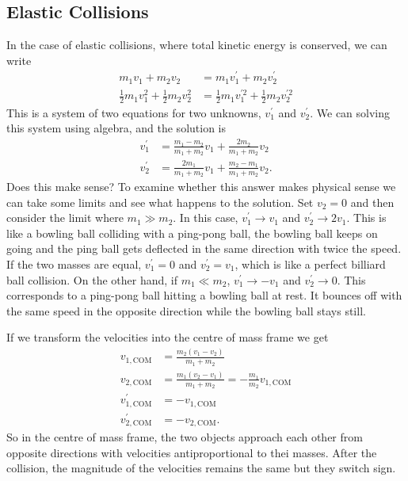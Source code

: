\documentclass[../classical_mechanics.tex]{subfiles}
\begin{document}
        \subsection{Elastic Collisions}\label{subsec:elastic-collisions}
            In the case of elastic collisions, where total kinetic energy is conserved, we can write
            \begin{align}
                m_1v_1+m_2v_2&=m_1v_1^\prime+m_2v_2^\prime\\
                \frac{1}{2}m_1v_1^2+\frac{1}{2}m_2v_2^2&=\frac{1}{2}m_1v_1^{\prime 2}+\frac{1}{2}m_2v_2^{\prime 2}
            \end{align}
            This is a system of two equations for two unknowns, $v_1^\prime$ and $v_2^\prime$.
            We can solving this system using algebra, and the solution is
            \begin{align}
                v_1^\prime&=\frac{m_1-m_2}{m_1+m_2}v_1+\frac{2m_2}{m_1+m_2}v_2\\
                v_2^\prime&=\frac{2m_1}{m_1+m_2}v_1+\frac{m_2-m_1}{m_1+m_2}v_2.
            \end{align}
            Does this make sense?
            To examine whether this answer makes physical sense we can take some limits and see what happens to the solution.
            Set $v_2=0$ and then consider the limit where $m_1\gg m_2$.
            In this case, $v_1^\prime\to v_1$ and $v_2^\prime\to 2v_1$.
            This is like a bowling ball colliding with a ping-pong ball, the bowling ball keeps on going and the ping ball gets deflected in the same direction with twice the speed.
            If the two masses are equal, $v_1^\prime=0$ and $v_2^\prime=v_1$, which is like a perfect billiard ball collision.
            On the other hand, if $m_1\ll m_2$, $v_1^\prime\to -v_1$ and $v_2^\prime\to 0$.
            This corresponds to a ping-pong ball hitting a bowling ball at rest. It bounces off with the same speed in the opposite direction while the bowling ball stays still.

            If we transform the velocities into the centre of mass frame we get
            \begin{align}
                v_{1,\text{COM}}&=\frac{m_2(v_1-v_2)}{m_1+m_2}\\
                v_{2,\text{COM}}&=\frac{m_1(v_2-v_1)}{m_1+m_2}=-\frac{m_1}{m_2}v_{1,\text{COM}}\\
                v_{1,\text{COM}}^\prime&=-v_{1,\text{COM}}\\
                v_{2,\text{COM}}^\prime&=-v_{2,\text{COM}}.
            \end{align}
            So in the centre of mass frame, the two objects approach each other from opposite directions with velocities antiproportional to thei masses.
            After the collision, the magnitude of the velocities remains the same but they switch sign.
        
\end{document}
